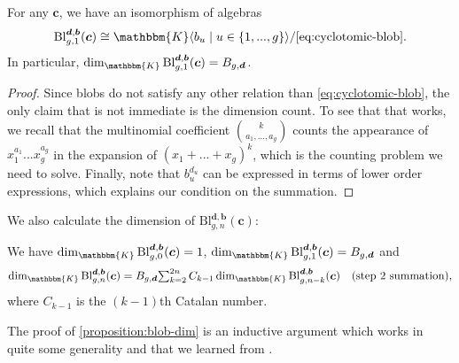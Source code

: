 \documentclass[a4paper,11pt]{amsart}
\renewcommand{\dots}{\text{...}}
\newcommand{\setstuff}[1]{\mathrm{#1}}
\newcommand{\KK}{\mathbbm{K}}
\newcommand{\bsym}[1]{\boldsymbol{#1}}
\newcommand{\cpar}{\bsym{c}}
\newcommand{\bpar}{\bsym{b}}
\newcommand{\dpar}{\bsym{d}}
\numberwithin{equation}{section}
\let\fullref\autoref
\begin{document}
\begin{lemma}\label{lemma:blob-onestrand}
For any $\cpar$, we have an isomorphism of algebras
\begin{gather*}
\setstuff{Bl}_{g,1}^{\dpar,\bpar}(\cpar)
\cong
\KK\langle b_{u}\mid u\in\{1,\dots,g\}\rangle
/\eqref{eq:cyclotomic-blob}
.
\end{gather*}
In particular, 
$\dim_{\KK}\setstuff{Bl}_{g,1}^{\dpar,\bpar}(\cpar)=B_{g,\dpar}$.
\end{lemma}

\begin{proof}
Since blobs do not satisfy any other relation than \eqref{eq:cyclotomic-blob},
the only claim that is not immediate is the dimension count. 
To see that that works, we recall that the multinomial coefficient 
$\binom{k}{a_{1},\dots,a_{g}}$
counts the appearance of $x^{a_{1}}_{1}\dots x^{a_{g}}_{g}$ in the expansion 
of $(x_{1}+\dots+x_{g})^{k}$, which is the counting problem we need to solve.
Finally, note that $b_{u}^{d_{u}}$ can be expressed in terms of
lower order expressions, which explains our condition on the summation.
\end{proof}

We also calculate the dimension of 
$\setstuff{Bl}_{g,n}^{\dpar,\bpar}(\cpar)$:

\begin{proposition}\label{proposition:blob-dim}
We have $\dim_{\KK}\setstuff{Bl}_{g,0}^{\dpar,\bpar}(\cpar)=1$, 
$\dim_{\KK}\setstuff{Bl}_{g,1}^{\dpar,\bpar}(\cpar)=B_{g,\dpar}$ and
\begin{gather}\label{eq:blob-dim}
\dim_{\KK}\setstuff{Bl}_{g,n}^{\dpar,\bpar}(\cpar)
=
B_{g,\dpar}
{\textstyle\sum_{k=2}^{2n}}\,C_{k-1}\dim_{\KK}
\setstuff{Bl}_{g,n-k}^{\dpar,\bpar}(\cpar)
\quad\text{(step $2$ summation)},
\end{gather}
where $C_{k-1}$ is the $(k-1)$th Catalan number.
\end{proposition}

The proof of \fullref{proposition:blob-dim} 
is an inductive argument which works in quite some 
generality and that we learned from \cite{tDi-sym-bridges}.
\end{document}
